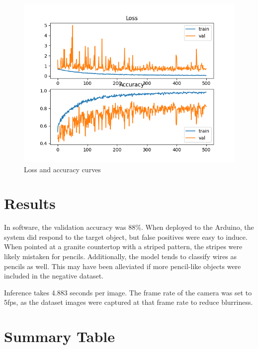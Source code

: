 \documentclass{article}
\begin{document}
\begin{figure}[h]
    \begin{center}
    \includegraphics[width=320pt,height=240pt]{images/training.png}
    \caption{Loss and accuracy curves}
    \label{fig:loss}
    \end{center}
\end{figure}

\section{Results}
In software, the validation accuracy was 88\%. When deployed
to the Arduino, the system did respond to the target object,
but false positives were easy to induce. When pointed at a
granite countertop with a striped pattern, the stripes were
likely mistaken for pencils. Additionally, the model tends
to classify wires as pencils as well. This may have been
alleviated if more pencil-like objects were included in the
negative dataset.

Inference takes 4.883 seconds per image. The frame rate of
the camera was set to 5fps, as the dataset images were
captured at that frame rate to reduce blurriness. 
\section{Summary Table}
\end{document}
